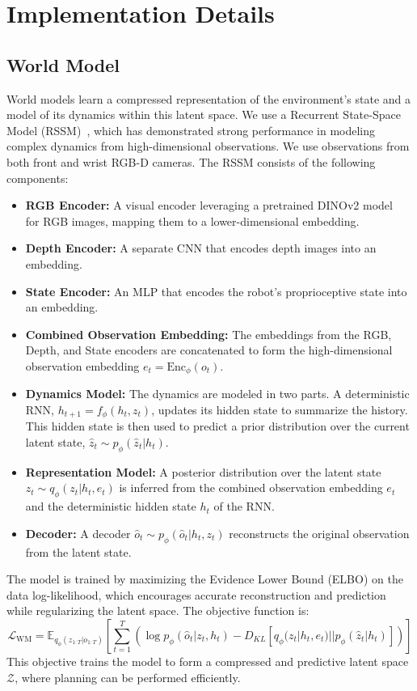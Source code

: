 \documentclass{article} %
\begin{document}
\newpage
\section{Implementation Details}
\label{app:implementation}
\subsection{World Model}
World models learn a compressed representation of the environment's state and a model of its dynamics within this latent space. We use a Recurrent State-Space Model (RSSM)~\citep{pmlr-v97-hafner19a}, which has demonstrated strong performance in modeling complex dynamics from high-dimensional observations. We use observations from both front and wrist RGB-D cameras. The RSSM consists of the following components:
\begin{itemize}
    \item \textbf{RGB Encoder:} A visual encoder leveraging a pretrained DINOv2 model~\citep{oquab2024dinov} for RGB images, mapping them to a lower-dimensional embedding.
    \item \textbf{Depth Encoder:} A separate CNN that encodes depth images into an embedding.
    \item \textbf{State Encoder:} An MLP that encodes the robot's proprioceptive state into an embedding.
    \item \textbf{Combined Observation Embedding:} The embeddings from the RGB, Depth, and State encoders are concatenated to form the high-dimensional observation embedding $e_t = \text{Enc}_\phi(o_t)$.
    \item \textbf{Dynamics Model:} The dynamics are modeled in two parts. A deterministic RNN, $h_{t+1} = f_\phi(h_t, z_t)$, updates its hidden state to summarize the history. This hidden state is then used to predict a prior distribution over the current latent state, $\hat{z}_t \sim p_\phi(\hat{z}_t | h_t)$.
    \item \textbf{Representation Model:} A posterior distribution over the latent state $z_t \sim q_\phi(z_t | h_t, e_t)$ is inferred from the combined observation embedding $e_t$ and the deterministic hidden state $h_t$ of the RNN.
    \item \textbf{Decoder:} A decoder $\hat{o}_t \sim p_\phi(\hat{o}_t | h_t, z_t)$ reconstructs the original observation from the latent state.
\end{itemize}
The model is trained by maximizing the Evidence Lower Bound (ELBO) on the data log-likelihood, which encourages accurate reconstruction and prediction while regularizing the latent space. The objective function is:
\begin{equation}
    \mathcal{L}_{\text{WM}} = \mathbb{E}_{q_\phi(z_{1:T}|o_{1:T})} \left[ \sum_{t=1}^T \left( \log p_\phi(\hat{o}_t|z_t, h_t) - D_{KL}[q_\phi(z_t|h_t, e_t) || p_\phi(\hat{z}_t|h_t)] \right) \right]
\end{equation}
This objective trains the model to form a compressed and predictive latent space $\mathcal{Z}$, where planning can be performed efficiently.
\end{document}
